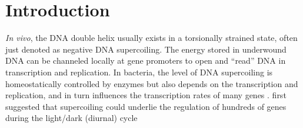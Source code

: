 \documentclass[10pt,a4]{article}
\def\cite#1{\hypersetup{citecolor=Teal}\citep{#1}} %
\begin{document}
\section{Introduction}
\textit{In vivo}, the DNA double helix usually exists in a torsionally
strained state, often just denoted as negative DNA supercoiling.  The
energy stored in underwound DNA can be channeled locally at gene
promoters to open and ``read'' DNA in transcription and replication.
In bacteria, the level of DNA supercoiling is homeostatically controlled by
enzymes but also depends on the transcription and replication, and
in turn influences the transcription rates of many genes \cite{Dorman2019}. 
%
%
%
\citet{Mori2001} first suggested that supercoiling could underlie the
regulation of hundreds of genes during the light/dark (diurnal) cycle
\end{document}
